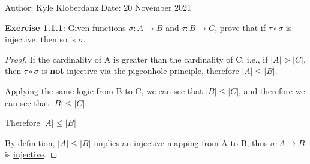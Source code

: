 \documentclass[a4paper]{article}
\begin{document}
\begin{myparindent}{0pt}

Author: Kyle Kloberdanz \newline
Date: 20 November 2021 \newline

\textbf{Exercise 1.1.1}:
Given functions $\sigma: A \rightarrow B$ and $\tau: B \rightarrow C$,
prove that if $\tau \circ \sigma$ is injective, then so is $\sigma$.

\begin{proof}
If the cardinality of A is greater than the cardinality of C, i.e., if
$|A| > |C|$, then $\tau \circ \sigma$ is \textbf{not} injective via the
pigeonhole principle, therefore $|A| \le |B|$. \newline

Applying the same logic from B to C, we can see that $|B| \le |C|$, and
therefore we can see that $|B| \le |C|$. \newline

Therefore $|A| \le |B|$ \newline

By definition, $|A| \le |B|$ implies an injective mapping from A to B,\newline
thus $\sigma: A \rightarrow B$ is \underline{injective}.
\end{proof}

\end{myparindent}
\end{document}
